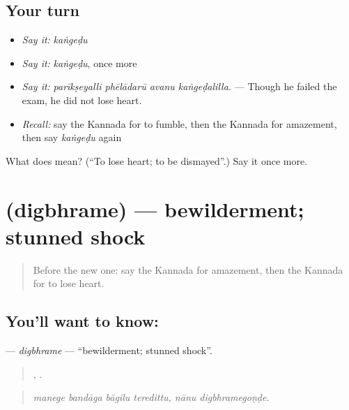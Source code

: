 \subsection*{Your turn}
\begin{itemize}
\raggedright
  \item \emph{Say it:} \emph{kaṅgeḍu}
  \item \emph{Say it:} \emph{kaṅgeḍu}, once more
  \item \emph{Say it:} \emph{parīkṣeyalli phēlādarū avanu kaṅgeḍalilla.} — Though he failed the exam, he did not lose heart.
  \item \emph{Recall:} say the Kannada for to fumble, then the Kannada for amazement, then say \emph{kaṅgeḍu} again
\end{itemize}

\begin{tcolorbox}[breakable,colback=teal!4,colframe=teal!35!black,title={Before you move on}]
What does  mean? (\textquotedblleft{}To lose heart; to be dismayed\textquotedblright{}.) Say it once more.
\end{tcolorbox}
\section[\texorpdfstring{\kn{ದಿಗ್ಭ್ರಮೆ} (digbhrame)}{ದಿಗ್ಭ್ರಮೆ (digbhrame)}]{ (digbhrame) — bewilderment; stunned shock}

\label{lesson:KA-C494-digbhrame}



\begin{quote}
Before the new one: say the Kannada for amazement, then the Kannada for to lose heart.
\end{quote}

\subsection*{You'll want to know: }
\textbf{} — \emph{digbhrame} — \textquotedblleft{}bewilderment; stunned shock\textquotedblright{}.

\begin{quote}
   ,  .
\end{quote}

\begin{quote}
\emph{manege bandāga bāgilu teredittu, nānu digbhramegoṇḍe.}
\end{quote}


